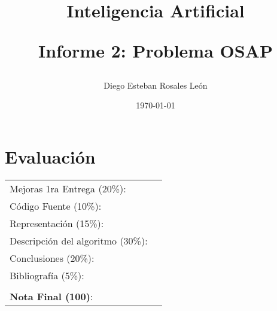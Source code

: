 \documentclass[letter, 10pt]{article}
\begin{document}
\title{Inteligencia Artificial \\ \begin{Large}Informe 2: Problema OSAP\end{Large}}
\author{Diego Esteban Rosales Le\'on}
\date{\today}
\maketitle

\section*{Evaluaci\'on}

\begin{tabular}{ll}
Mejoras 1ra Entrega (20\%): &  \underline{\hspace{2cm}}\\
C\'odigo Fuente (10\%): &  \underline{\hspace{2cm}}\\
Representaci\'on (15\%):  & \underline{\hspace{2cm}} \\
Descripci\'on del algoritmo (30\%):  & \underline{\hspace{2cm}} \\
Conclusiones (20\%): &  \underline{\hspace{2cm}}\\
Bibliograf\'ia (5\%): & \underline{\hspace{2cm}}\\
 &  \\
\textbf{Nota Final (100)}:   & \underline{\hspace{2cm}}
\end{tabular}
\vspace{2cm}
\end{document}
